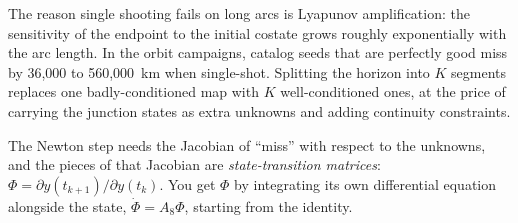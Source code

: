 \documentclass[11pt]{article}
\begin{document}
\begin{intu}
The reason single shooting fails on long arcs is Lyapunov amplification: the
sensitivity of the endpoint to the initial costate grows roughly exponentially
with the arc length. In the orbit campaigns, catalog seeds that are perfectly
good miss by 36{,}000 to 560{,}000~km when single-shot. Splitting the horizon
into $K$ segments replaces one badly-conditioned map with $K$ well-conditioned
ones, at the price of carrying the junction states as extra unknowns and adding
continuity constraints.

The Newton step needs the Jacobian of ``miss'' with respect to the unknowns, and
the pieces of that Jacobian are \emph{state-transition matrices}: $\Phi =
\partial y(t_{k+1})/\partial y(t_k)$. You get $\Phi$ by integrating its own
differential equation alongside the state, $\dot\Phi = A_8\Phi$, starting from
the identity.
\end{intu}
\end{document}
